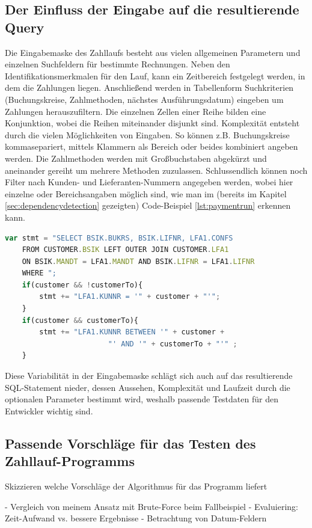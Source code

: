 \subsection{Der Einfluss der Eingabe auf die resultierende Query}
Die Eingabemaske des Zahllaufs besteht aus vielen allgemeinen Parametern und einzelnen Suchfeldern für bestimmte Rechnungen.
Neben den Identifikationsmerkmalen für den Lauf, kann ein Zeitbereich festgelegt werden, in dem die Zahlungen liegen.
Anschließend werden in Tabellenform Suchkriterien (Buchungskreise, Zahlmethoden, nächstes Ausführungsdatum) eingeben um Zahlungen herauszufiltern.
Die einzelnen Zellen einer Reihe bilden eine Konjunktion, wobei die Reihen miteinander disjunkt sind.
Komplexität entsteht durch die vielen Möglichkeiten von Eingaben.
So können z.B. Buchungskreise kommasepariert, mittels Klammern als Bereich oder beides kombiniert angeben werden.
Die Zahlmethoden werden mit Großbuchstaben abgekürzt und aneinander gereiht um mehrere Methoden zuzulassen.
Schlussendlich können noch Filter nach Kunden- und Lieferanten-Nummern angegeben werden, wobei hier einzelne oder Bereichsangaben möglich sind, wie man im (bereits im Kapitel \ref{sec:dependencydetection} gezeigten) Code-Beispiel \ref{lst:paymentrun} erkennen kann.

\begin{lstlisting}[caption={Mehrere Möglichkeiten des Auswahl anhand von Kundennummern}, label={lst:paymentrun}, language=JavaScript]
	var stmt = "SELECT BSIK.BUKRS, BSIK.LIFNR, LFA1.CONFS
	FROM CUSTOMER.BSIK LEFT OUTER JOIN CUSTOMER.LFA1
	ON BSIK.MANDT = LFA1.MANDT AND BSIK.LIFNR = LFA1.LIFNR
	WHERE ";
	if(customer && !customerTo){
		stmt += "LFA1.KUNNR = '" + customer + "'";
	}
	if(customer && customerTo){
		stmt += "LFA1.KUNNR BETWEEN '" + customer +
						"' AND '" + customerTo + "'" ;
	}
\end{lstlisting}

Diese Variabilität in der Eingabemaske schlägt sich auch auf das resultierende SQL-Statement nieder, dessen Aussehen, Komplexität und Laufzeit durch die optionalen Parameter bestimmt wird, weshalb passende Testdaten für den Entwickler wichtig sind.

\subsection{Passende Vorschl{\"a}ge f{\"u}r das Testen des Zahllauf-Programms}
Skizzieren welche Vorschläge der Algorithmus für das Programm liefert

- Vergleich von meinem Ansatz mit Brute-Force beim Fallbeispiel
  - Evaluiering: Zeit-Aufwand vs. bessere Ergebnisse
  - Betrachtung von Datum-Feldern